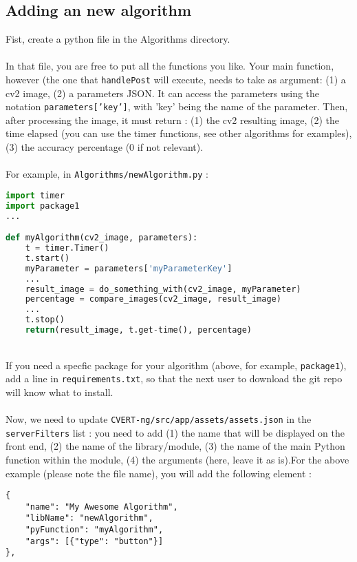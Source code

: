 \documentclass[12pt,a4paper]{article}
\begin{document}
\subsection{Adding an new algorithm}
Fist, create a python file in the Algorithms directory.\\
~\\
In that file, you are free to put all the functions you like. Your main function, however (the one that \texttt{handlePost} will execute, needs to take as argument: (1) a cv2 image, (2) a parameters JSON. It can access the parameters using the notation \texttt{parameters['key']}, with 'key' being the name of the parameter. Then, after processing the image, it must return : (1) the cv2 resulting image, (2) the time elapsed (you can use the timer functions, see other algorithms for examples), (3) the accuracy percentage (0 if not relevant).\\
~\\
For example, in \texttt{Algorithms/newAlgorithm.py} :
\begin{lstlisting}[language=Python]
import timer
import package1
...

def myAlgorithm(cv2_image, parameters):
	t = timer.Timer()
	t.start()
	myParameter = parameters['myParameterKey']
	...
	result_image = do_something_with(cv2_image, myParameter)
	percentage = compare_images(cv2_image, result_image)
	...
	t.stop()
	return(result_image, t.get-time(), percentage)
\end{lstlisting}
~\\
If you need a specfic package for your algorithm (above, for example, \texttt{package1}), add a line in \texttt{requirements.txt}, so that the next user to download the git repo will know what to install.\\
~\\
Now, we need to update \texttt{CVERT-ng/src/app/assets/assets.json} in the \texttt{serverFilters} list : you need to add (1) the name that will be displayed on the front end, (2) the name of the library/module, (3) the name of the main Python function within the module, (4) the arguments (here, leave it as is).For the above example (please note the file name), you will add the following element :\\

\begin{lstlisting}
{
    "name": "My Awesome Algorithm",
    "libName": "newAlgorithm",
    "pyFunction": "myAlgorithm",
    "args": [{"type": "button"}]
},
\end{lstlisting}
\end{document}
